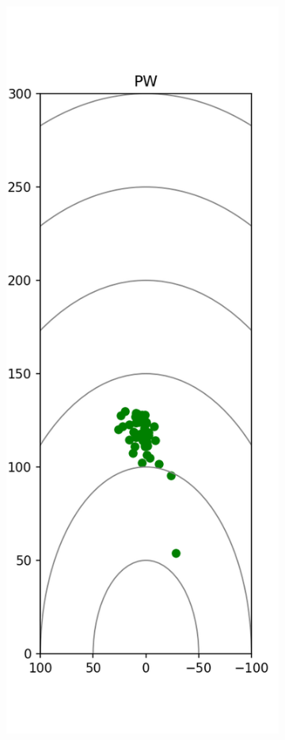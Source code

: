 \documentclass{kththesis}
\begin{document}
\begin{figure}
    \centering
    \begin{subfigure}{0.4\textwidth}
    \centering
    \includegraphics[height=0.4\textheight]{Shots/PW_shots.png} 

\end{subfigure}
\end{figure}
\end{document}
